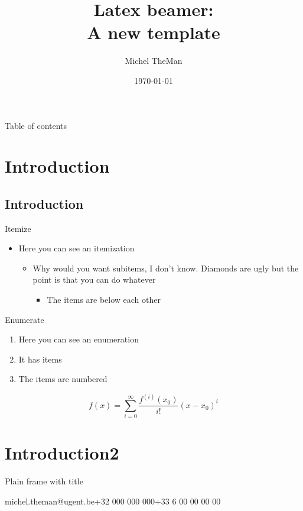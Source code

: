 \documentclass[ aspectratio=169]{beamer}
\title{Latex beamer:\\ A new template}
\date{\today}
\author{Michel TheMan}
\institute{\textbf{Department of Environment}\\Laboratory of Wood Technology, UGent-Woodlab }
\begin{document}
\frame{\titlepage} 
\begin{frame}{Table of contents}
	\tableofcontents
\end{frame} 
 
\section{Introduction}
\subsection{Introduction}

\begin{frame}[fragile, t]{Itemize}    
\begin{itemize}
\item Here you can see an itemization
\begin{itemize}
\item Why would you want subitems, I don't know. Diamonds are ugly but the point is that you can do whatever
\begin{itemize}
\item The items are below each other
\end{itemize}
\end{itemize}
\end{itemize}
\end{frame}
 
\begin{frame}{Enumerate}
\begin{enumerate}
\item Here you can see an enumeration 
\item It has items
\item The items are numbered    
\end{enumerate}
\[
	f(x)=\sum_{i=0}^\infty \frac{f^{(i)}(x_0)}{i!}(x-x_0)^i
\]
\end{frame}
 
\section{Introduction2}    
   

\begin{frame}[t]{Plain frame with title}
\lipsum[1]
\end{frame}

	{michel.theman@ugent.be}{+32 000 000 000}{+33 6 00 00 00 00}    
\end{document}
